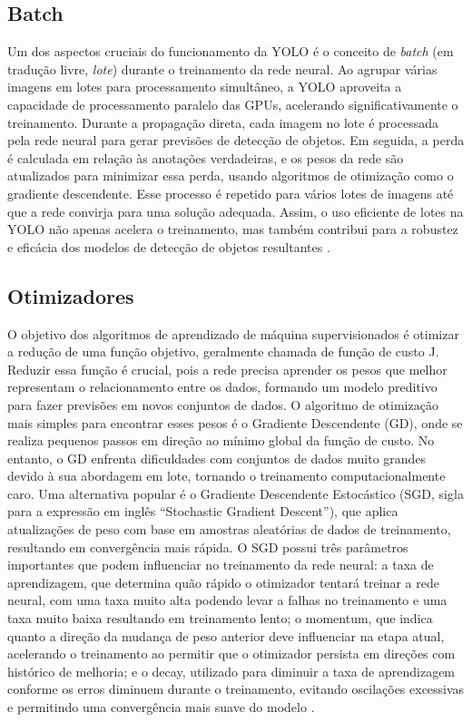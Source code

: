 \subsection{Batch}
\label{sec:batch}

Um dos aspectos cruciais do funcionamento da YOLO é o conceito de \textit{batch} (em tradução livre, \textit{lote}) durante o treinamento da rede neural. Ao agrupar várias imagens em lotes para processamento simultâneo, a YOLO aproveita a capacidade de processamento paralelo das GPUs, acelerando significativamente o treinamento. Durante a propagação direta, cada imagem no lote é processada pela rede neural para gerar previsões de detecção de objetos. Em seguida, a perda é calculada em relação às anotações verdadeiras, e os pesos da rede são atualizados para minimizar essa perda, usando algoritmos de otimização como o gradiente descendente. Esse processo é repetido para vários lotes de imagens até que a rede convirja para uma solução adequada. Assim, o uso eficiente de lotes na YOLO não apenas acelera o treinamento, mas também contribui para a robustez e eficácia dos modelos de detecção de objetos resultantes \cite{goodfellow2016deep}.

\subsection{Otimizadores}
\label{sec:otimizadores}

O objetivo dos algoritmos de aprendizado de máquina supervisionados é otimizar a redução de uma função objetivo, geralmente chamada de função de custo J. Reduzir essa função é crucial, pois a rede precisa aprender os pesos que melhor representam o relacionamento entre os dados, formando um modelo preditivo para fazer previsões em novos conjuntos de dados. O algoritmo de otimização mais simples para encontrar esses pesos é o Gradiente Descendente (GD), onde se realiza pequenos passos em direção ao mínimo global da função de custo. No entanto, o GD enfrenta dificuldades com conjuntos de dados muito grandes devido à sua abordagem em lote, tornando o treinamento computacionalmente caro. Uma alternativa popular é o Gradiente Descendente Estocástico (SGD, sigla para a expressão em inglês “Stochastic Gradient Descent”), que aplica atualizações de peso com base em amostras aleatórias de dados de treinamento, resultando em convergência mais rápida. O  SGD possui três parâmetros importantes que podem influenciar no treinamento da rede neural: a taxa de aprendizagem, que determina quão rápido o otimizador tentará treinar a rede neural, com uma taxa muito alta podendo levar a falhas no treinamento e uma taxa muito baixa resultando em treinamento lento; o momentum, que indica quanto a direção da mudança de peso anterior deve influenciar na etapa atual, acelerando o treinamento ao permitir que o otimizador persista em direções com histórico de melhoria; e o decay, utilizado para diminuir a taxa de aprendizagem conforme os erros diminuem durante o treinamento, evitando oscilações excessivas e permitindo uma convergência mais suave do modelo \cite{silva2018estudo}.


